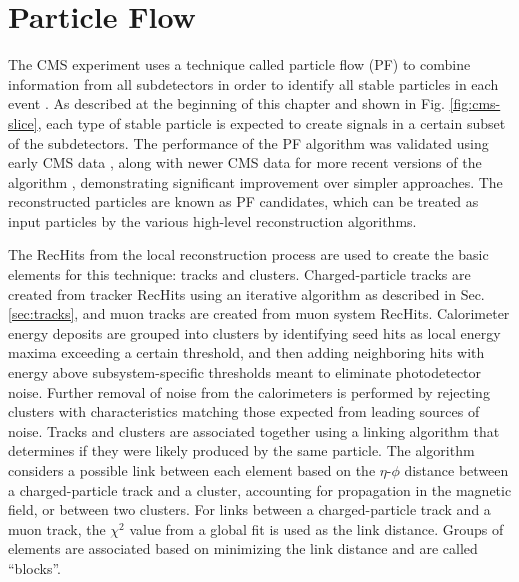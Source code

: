 \section{Particle Flow
\label{sec:particle-flow}}

The CMS experiment uses a technique called particle flow (PF) to combine information from all subdetectors in order to identify all stable particles in each event \cite{CMS-PAS-PFT-09-001}. As described at the beginning of this chapter and shown in Fig. \ref{fig:cms-slice}, each type of stable particle is expected to create signals in a certain subset of the subdetectors. The performance of the PF algorithm was validated using early CMS data \cite{CMS-PAS-PFT-10-002,CMS-PAS-PFT-10-003}, along with newer CMS data for more recent versions of the algorithm \cite{Beaudette:2014cea}, demonstrating significant improvement over simpler approaches. The reconstructed particles are known as PF candidates, which can be treated as input particles by the various high-level reconstruction algorithms.

The RecHits from the local reconstruction process are used to create the basic elements for this technique: tracks and clusters. Charged-particle tracks are created from tracker RecHits using an iterative algorithm as described in Sec. \ref{sec:tracks}, and muon tracks are created from muon system RecHits. Calorimeter energy deposits are grouped into clusters by identifying seed hits as local energy maxima exceeding a certain threshold, and then adding neighboring hits with energy above subsystem-specific thresholds meant to eliminate photodetector noise. Further removal of noise from the calorimeters is performed by rejecting clusters with characteristics matching those expected from leading sources of noise. Tracks and clusters are associated together using a linking algorithm that determines if they were likely produced by the same particle. The algorithm considers a possible link between each element based on the $\eta$-$\phi$ distance between a charged-particle track and a cluster, accounting for propagation in the magnetic field, or between two clusters. For links between a charged-particle track and a muon track, the $\chi^{2}$ value from a global fit is used as the link distance. Groups of elements are associated based on minimizing the link distance and are called ``blocks''.

